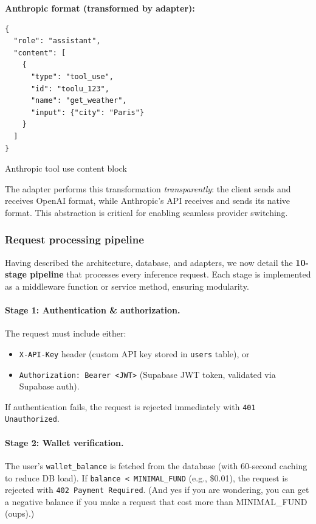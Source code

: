 \documentclass[english]{article}
\begin{document}
\textbf{Anthropic format (transformed by adapter):}
\begin{listing}[H]
\begin{verbatim}
{
  "role": "assistant",
  "content": [
    {
      "type": "tool_use",
      "id": "toolu_123",
      "name": "get_weather",
      "input": {"city": "Paris"}
    }
  ]
}
\end{verbatim}
\caption{Anthropic tool use content block}
\end{listing}

The adapter performs this transformation \emph{transparently}: the client sends and receives OpenAI format, while Anthropic's API receives and sends its native format. This abstraction is critical for enabling seamless provider switching.


\subsubsection{Request processing pipeline}

Having described the architecture, database, and adapters, we now detail the \textbf{10-stage pipeline} that processes every inference request. Each stage is implemented as a middleware function or service method, ensuring modularity.

\paragraph{Stage 1: Authentication \& authorization.}

The request must include either:
\begin{itemize}
    \item \texttt{X-API-Key} header (custom API key stored in \texttt{users} table), or
    \item \texttt{Authorization: Bearer <JWT>} (Supabase JWT token, validated via Supabase auth).
\end{itemize}

If authentication fails, the request is rejected immediately with \texttt{401 Unauthorized}.

\paragraph{Stage 2: Wallet verification.}

The user's \texttt{wallet\_balance} is fetched from the database (with 60-second caching to reduce DB load). If \texttt{balance < MINIMAL\_FUND} (e.g., \$0.01), the request is rejected with \texttt{402 Payment Required}. (And yes if you are wondering, you can get a negative balance if you make a request that cost more than MINIMAL\_FUND (oups).)
\end{document}

